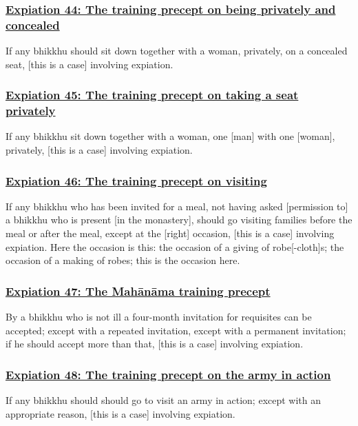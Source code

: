 \subsubsection*{\hyperref[pac44]{Expiation 44: The training precept on being privately and concealed}}
\label{exp44}
If any bhikkhu should sit down together with a woman, privately, on a concealed seat, [this is a case] involving expiation.

\subsubsection*{\hyperref[pac45]{Expiation 45: The training precept on taking a seat privately}}
\label{exp45}
If any bhikkhu sit down together with a woman, one [man] with one [woman], privately, [this is a case] involving expiation.

\subsubsection*{\hyperref[pac46]{Expiation 46: The training precept on visiting}}
\label{exp46}
If any bhikkhu who has been invited for a meal, not having asked [permission to] a bhikkhu who is present [in the monastery], should go visiting families before the meal or after the meal, except at the [right] occasion, [this is a case] involving expiation. Here the occasion is this: the occasion of a giving of robe[-cloth]s; the occasion of a making of robes; this is the occasion here.

\subsubsection*{\hyperref[pac47]{Expiation 47: The Mahānāma training precept}}
\label{exp47}
By a bhikkhu who is not ill a four-month invitation for requisites can be accepted; except with a repeated invitation, except with a permanent invitation; if he should accept more than that, [this is a case] involving expiation.

\subsubsection*{\hyperref[pac48]{Expiation 48: The training precept on the army in action}}
\label{exp48}
If any bhikkhu should should go to visit an army in action; except with an appropriate reason, [this is a case] involving expiation.

